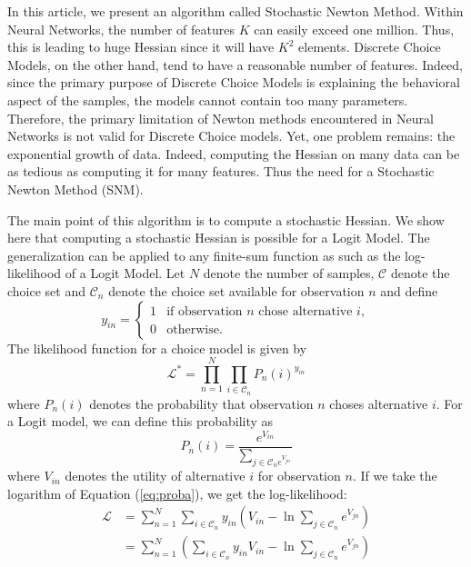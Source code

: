 \documentclass[conference]{IEEEtran}
\begin{document}
In this article, we present an algorithm called Stochastic Newton Method. Within Neural Networks, the number of features $K$ can easily exceed one million. Thus, this is leading to huge Hessian since it will have $K^2$ elements. Discrete Choice Models, on the other hand, tend to have a reasonable number of features. Indeed, since the primary purpose of Discrete Choice Models is explaining the behavioral aspect of the samples, the models cannot contain too many parameters. Therefore, the primary limitation of Newton methods encountered in Neural Networks is not valid for Discrete Choice models. Yet, one problem remains: the exponential growth of data. Indeed, computing the Hessian on many data can be as tedious as computing it for many features. Thus the need for a Stochastic Newton Method (SNM).

The main point of this algorithm is to compute a stochastic Hessian. We show here that computing a stochastic Hessian is possible for a Logit Model. The generalization can be applied to any finite-sum function as such as the log-likelihood of a Logit Model. Let $N$ denote the number of samples, $\mathcal{C}$ denote the choice set and $\mathcal{C}_n$ denote the choice set available for observation $n$ and define
\[
y_{in} = 
\begin{cases}
1 & \text{if observation $n$ chose alternative $i$}, \\
0 & \text{otherwise}.
\end{cases}
\]
The likelihood function for a choice model is given by
\begin{equation}
\mathcal{L}^* = \prod_{n=1}^N \prod_{i\in\mathcal{C}_n} P_n(i)^{y_{in}}
\end{equation}
where $P_n(i)$ denotes the probability that observation $n$ choses alternative $i$. For a Logit model, we can define this probability as
\begin{equation}
\label{eq:proba}
P_n(i) = \frac{e^{V_{in}}}{\sum_{j\in\mathcal{C}_n e^{V_{jn}}}}
\end{equation}
where $V_{in}$ denotes the utility of alternative $i$ for observation $n$. If we take the logarithm of Equation (\ref{eq:proba}), we get the log-likelihood:
\begin{align}
\label{eq:log-likelihood}
\mathcal{L} &= \sum_{n=1}^N\sum_{i\in\mathcal{C}_n} y_{in}\left( V_{in} - \ln \sum_{j\in\mathcal{C}_n}e^{V_{jn}} \right) \nonumber \\
&= \sum_{n=1}^N \left( \sum_{i\in\mathcal{C}_n} y_{in}V_{in} - \ln \sum_{j\in\mathcal{C}_n}e^{V_{jn}} \right) 
\end{align}
\end{document}
